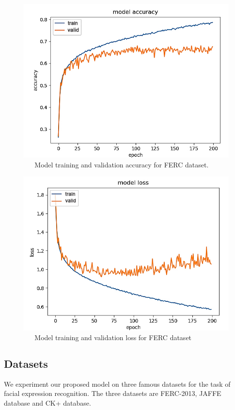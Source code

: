 \documentclass[master]{thesis-uestc}
\begin{document}
\begin{figure}[ht]
\includegraphics[width=5in]{pic/model_accuracy_fer.jpg}
\caption{\,\,\,\,\,\,\,\,\,\,Model training and validation accuracy for FERC dataset.}
\label{fer_accuracy}
\end{figure}

\begin{figure}[ht]
\includegraphics[width=5in]{pic/model_loss_fer.jpg}
\caption{\,\,\,\,\,\,\,\,\,\,Model training and validation loss for FERC dataset}
\label{fer_loss}
\end{figure}

\subsection{Datasets}
We experiment our proposed model on three famous datasets for the task of facial expression recognition. The three datasets are FERC-2013, JAFFE database and CK+ database.
\end{document}
